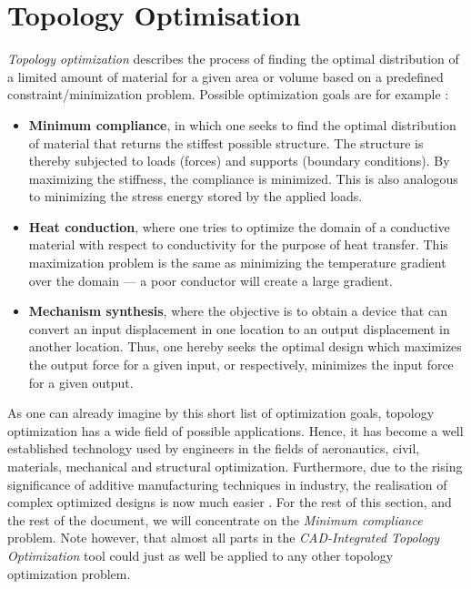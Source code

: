 \section{Topology Optimisation}
\label{sec:TopOpt}
\emph{Topology optimization} describes the process of finding the optimal distribution of a limited amount of material for a given area or volume based on a predefined constraint/minimization problem. Possible optimization goals are for example \cite{Hunter2009}:
\begin{itemize}
\item \textbf{Minimum compliance}, in which one seeks to find the optimal distribution of material that returns the stiffest possible structure. The structure is thereby subjected to loads (forces) and supports (boundary conditions). By maximizing the stiffness, the compliance is minimized. This is also analogous to minimizing the stress energy stored by the applied loads.
\item \textbf{Heat conduction}, where one tries to optimize the domain of a conductive material with respect to conductivity for the purpose of heat transfer. This maximization problem is the same as minimizing the temperature gradient over the domain --- a poor conductor will create a large gradient.
\item \textbf{Mechanism synthesis}, where the objective is to obtain a device that can convert an input displacement in one location to an output displacement in another location. Thus, one hereby seeks the optimal design which maximizes the output force for a given input, or respectively, minimizes the input force for a given output.
\end{itemize}


As one can already imagine by this short list of optimization goals, topology optimization has a wide field of possible applications. Hence, it has become a well established technology used by engineers in the fields of aeronautics, civil, materials, mechanical and structural optimization. Furthermore, due to the rising significance of additive manufacturing techniques in industry, the realisation of complex optimized designs is now much easier \cite{Yang1995}.
For the rest of this section, and the rest of the document, we will concentrate on the \emph{Minimum compliance} problem. Note however, that almost all parts in the \emph{CAD-Integrated Topology Optimization} tool could just as well be applied to any other topology optimization problem. 

